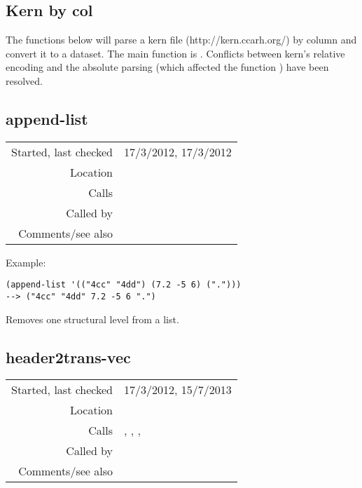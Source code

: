 \subsection{Kern by col}\label{sec:kern-by-col}

The functions below will parse a kern file
(http://kern.ccarh.org/) by column and convert it to a
dataset. The main function is
. Conflicts
between kern's relative encoding and the absolute
parsing (which affected the function
) have been resolved.


\subsection*{append-list}\label{fun:append-list}

\vspace{0.3cm}
\begin{tabular}{r|p{8cm}}
Started, last checked & 17/3/2012, 17/3/2012 \\
Location & \nameref{sec:kern-by-col} \\
Calls & \\
Called by & \nameref{fun:kern-col2dataset} \\
Comments/see also & \nameref{fun:append-list-of-lists}
\end{tabular}

\vspace{0.5cm}
\noindent Example:
\begin{verbatim}
(append-list '(("4cc" "4dd") (7.2 -5 6) (".")))
--> ("4cc" "4dd" 7.2 -5 6 ".")
\end{verbatim}

\noindent Removes one structural level from a list.


\subsection*{header2trans-vec}\label{fun:header2trans-vec}

\vspace{0.3cm}
\begin{tabular}{r|p{8cm}}
Started, last checked & 17/3/2012, 15/7/2013 \\
Location & \nameref{sec:kern-by-col} \\
Calls & \nameref{fun:firstn}, \nameref{fun:not-tie-dur-pitch-char-p}, \nameref{fun:space-bar-separated-string2list}, \nameref{fun:tab-separated-string2list} \\
Called by & \nameref{fun:kern-transp-file2dataset-by-col} \\
Comments/see also &
\end{tabular}

